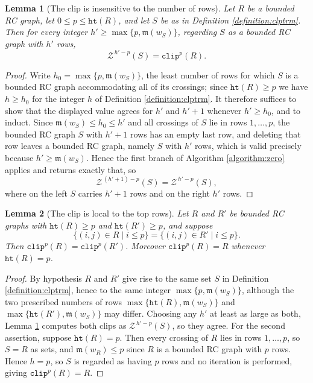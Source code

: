 \documentclass{amsart}
\newtheorem{lemma}{Lemma}[subsection]
\theoremstyle{definition}
\theoremstyle{remark}
\numberwithin{equation}{subsection}
\newcommand{\wof}[1]{w_{#1}}
\newcommand{\zeromap}{\mathcal{Z}}
\newcommand{\hr}{\mathtt{ht}}
\newcommand{\clp}{\mathtt{clip}}
\newcommand{\maxd}{\mathfrak{m}}
\begin{document}
\begin{lemma}[The clip is insensitive to the number of rows]\label{lemma:clipstable}
Let $R$ be a bounded RC graph, let $0\leq p\leq \hr(R)$, and let $S$ be as in Definition \ref{definition:clptrm}. Then for every integer $h'\geq\max\{p,\maxd(\wof S)\}$, regarding $S$ as a bounded RC graph with $h'$ rows,
$$\zeromap^{\,h'-p}(S)=\clp^p(R).$$
\end{lemma}
\begin{proof}
Write $h_0=\max\{p,\maxd(\wof S)\}$, the least number of rows for which $S$ is a bounded RC graph accommodating all of its crossings; since $\hr(R)\geq p$ we have $h\geq h_0$ for the integer $h$ of Definition \ref{definition:clptrm}. It therefore suffices to show that the displayed value agrees for $h'$ and $h'+1$ whenever $h'\geq h_0$, and to induct. Since $\maxd(\wof S)\leq h_0\leq h'$ and all crossings of $S$ lie in rows $1,\ldots,p$, the bounded RC graph $S$ with $h'+1$ rows has an empty last row, and deleting that row leaves a bounded RC graph, namely $S$ with $h'$ rows, which is valid precisely because $h'\geq\maxd(\wof S)$. Hence the first branch of Algorithm \ref{algorithm:zero} applies and returns exactly that, so
$$\zeromap^{\,(h'+1)-p}(S)=\zeromap^{\,h'-p}(S),$$
where on the left $S$ carries $h'+1$ rows and on the right $h'$ rows.
\end{proof}

\begin{lemma}[The clip is local to the top rows]\label{lemma:cliplocal}
Let $R$ and $R'$ be bounded RC graphs with $\hr(R)\geq p$ and $\hr(R')\geq p$, and suppose
$$\{(i,j)\in R\mid i\leq p\}=\{(i,j)\in R'\mid i\leq p\}.$$
Then $\clp^p(R)=\clp^p(R')$. Moreover $\clp^p(R)=R$ whenever $\hr(R)=p$.
\end{lemma}
\begin{proof}
By hypothesis $R$ and $R'$ give rise to the same set $S$ in Definition \ref{definition:clptrm}, hence to the same integer $\max\{p,\maxd(\wof S)\}$, although the two prescribed numbers of rows $\max\{\hr(R),\maxd(\wof S)\}$ and $\max\{\hr(R'),\maxd(\wof S)\}$ may differ. Choosing any $h'$ at least as large as both, Lemma \ref{lemma:clipstable} computes both clips as $\zeromap^{\,h'-p}(S)$, so they agree. For the second assertion, suppose $\hr(R)=p$. Then every crossing of $R$ lies in rows $1,\ldots,p$, so $S=R$ as sets, and $\maxd(\wof R)\leq p$ since $R$ is a bounded RC graph with $p$ rows. Hence $h=p$, so $S$ is regarded as having $p$ rows and no iteration is performed, giving $\clp^p(R)=R$.
\end{proof}
\end{document}
